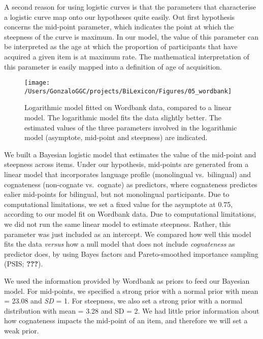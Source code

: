 \documentclass[english,man,man,floatsintext]{apa6}
\begin{document}
A second reason for using logistic curves is that the parameters that characterise a logistic curve map onto our hypotheses quite easily. Out first hypothesis concerns the mid-point parameter, which indicates the point at which the steepness of the curve is maximum. In our model, the value of this parameter can be interpreted as the age at which the proportion of participants that have acquired a given item is at maximum rate. The mathematical interpretation of this parameter is easily mapped into a definition of age of acquisition.

\begin{figure}

{\centering \texttt{[image: /Users/GonzaloGGC/projects/BiLexicon/Figures/05\_wordbank]} 

}

\caption{Logarithmic model fitted on Wordbank data, compared to a linear model. The logarithmic model fits the data slightly better. The estimated values of the three parameters involved in the logarithmic model (asymptote, mid-point and steepness) are indicated.}\label{fig:wordbank}
\end{figure}

We built a Bayesian logistic model that estimates the value of the mid-point and steepness across items. Under our hypothesis, mid-points are generated from a linear model that incorporates language profile (monolingual vs.~bilingual) and cognateness (non-cognate vs.~cognate) as predictors, where cognateness predictes ealier mid-points for bilingual, but not monolingual participants. Due to computational limitations, we set a fixed value for the asymptote at 0.75, according to our model fit on Wordbank data. Due to computational limitations, we did not run the same linear model to estimate steepness. Rather, this parameter was just included as an intercept. We compared how well this model fits the data \emph{versus} how a null model that does not include \emph{cognateness} as predictor does, by using Bayes factors and Pareto-smoothed importance sampling (PSIS; {\textbf{???}}).

We used the information provided by Wordbank as priors to feed our Bayesian model. For mid-points, we specified a strong prior with a normal prior with mean = 23.08 and \emph{SD} = 1. For steepness, we also set a strong prior with a normal distribution with mean = 3.28 and SD = 2. We had little prior information about how cognateness impacts the mid-point of an item, and therefore we will set a weak prior.
\end{document}
